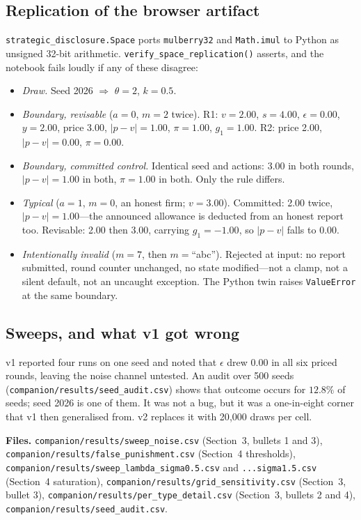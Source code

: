 \subsection{Replication of the browser artifact}
\texttt{strategic\_disclosure.Space} ports \texttt{mulberry32} and
\texttt{Math.imul} to Python as unsigned 32-bit arithmetic.
\texttt{verify\_space\_replication()} asserts, and the notebook fails loudly if
any of these disagree:

\begin{itemize}
\item \emph{Draw.} Seed 2026 $\Rightarrow$ $\theta=2$, $k=0.5$.
\item \emph{Boundary, revisable} ($a=0$, $m=2$ twice). R1: $v=2.00$, $s=4.00$,
$\epsilon=0.00$, $y=2.00$, price 3.00, $|p-v|=1.00$, $\pi=1.00$,
$g_1=1.00$. R2: price 2.00, $|p-v|=0.00$, $\pi=0.00$.
\item \emph{Boundary, committed control.} Identical seed and actions: 3.00 in
both rounds, $|p-v|=1.00$ in both, $\pi=1.00$ in both. Only the rule differs.
\item \emph{Typical} ($a=1$, $m=0$, an honest firm; $v=3.00$). Committed: 2.00
twice, $|p-v|=1.00$---the announced allowance is deducted from an honest report
too. Revisable: 2.00 then 3.00, carrying $g_1=-1.00$, so $|p-v|$ falls to 0.00.
\item \emph{Intentionally invalid} ($m=7$, then $m=$``abc''). Rejected at input:
no report submitted, round counter unchanged, no state modified---not a clamp,
not a silent default, not an uncaught exception. The Python twin raises
\texttt{ValueError} at the same boundary.
\end{itemize}

\subsection{Sweeps, and what v1 got wrong}
v1 reported four runs on one seed and noted that $\epsilon$ drew $0.00$ in all
six priced rounds, leaving the noise channel untested. An audit over 500 seeds
(\texttt{companion/results/seed\_audit.csv}) shows that outcome occurs for $12.8\%$ of
seeds; seed 2026 is one of them. It was not a bug, but it was a one-in-eight
corner that v1 then generalised from. v2 replaces it with 20{,}000 draws per
cell.

\noindent\textbf{Files.} \texttt{companion/results/sweep\_noise.csv} (Section~3,
bullets 1 and 3), \texttt{companion/results/false\_punishment.csv} (Section~4 thresholds),
\texttt{companion/results/sweep\_lambda\_sigma0.5.csv} and
\texttt{...sigma1.5.csv} (Section~4 saturation),
\texttt{companion/results/grid\_sensitivity.csv} (Section~3, bullet 3),
\texttt{companion/results/per\_type\_detail.csv} (Section~3, bullets 2 and 4),
\texttt{companion/results/seed\_audit.csv}.


